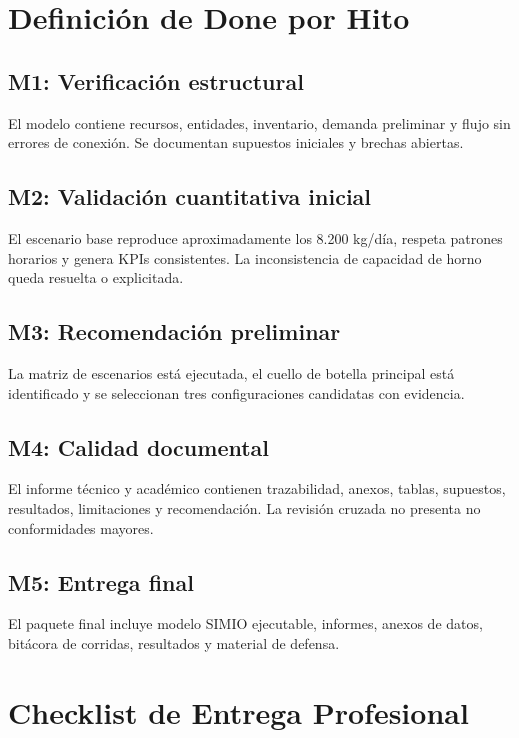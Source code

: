 \documentclass[11pt,letterpaper]{article}
\begin{document}
\section{Definición de Done por Hito}

\subsection*{M1: Verificación estructural}
El modelo contiene recursos, entidades, inventario, demanda preliminar y flujo sin errores de conexión. Se documentan supuestos iniciales y brechas abiertas.

\subsection*{M2: Validación cuantitativa inicial}
El escenario base reproduce aproximadamente los 8.200 kg/día, respeta patrones horarios y genera KPIs consistentes. La inconsistencia de capacidad de horno queda resuelta o explicitada.

\subsection*{M3: Recomendación preliminar}
La matriz de escenarios está ejecutada, el cuello de botella principal está identificado y se seleccionan tres configuraciones candidatas con evidencia.

\subsection*{M4: Calidad documental}
El informe técnico y académico contienen trazabilidad, anexos, tablas, supuestos, resultados, limitaciones y recomendación. La revisión cruzada no presenta no conformidades mayores.

\subsection*{M5: Entrega final}
El paquete final incluye modelo SIMIO ejecutable, informes, anexos de datos, bitácora de corridas, resultados y material de defensa.

\section{Checklist de Entrega Profesional}
\end{document}

